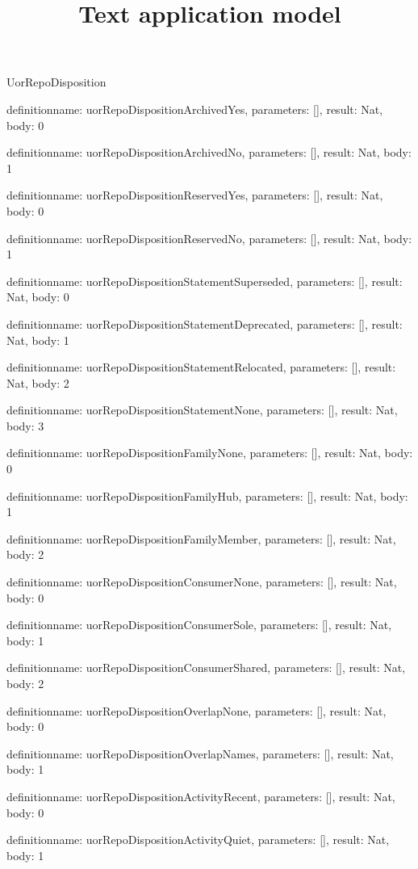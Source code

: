 \begin{lexlean}{UorRepoDisposition}
\title{Text application model}
\begin{semanticmodule}
definition{name: uorRepoDispositionArchivedYes, parameters: [], result: Nat, body: 0}

definition{name: uorRepoDispositionArchivedNo, parameters: [], result: Nat, body: 1}

definition{name: uorRepoDispositionReservedYes, parameters: [], result: Nat, body: 0}

definition{name: uorRepoDispositionReservedNo, parameters: [], result: Nat, body: 1}

definition{name: uorRepoDispositionStatementSuperseded, parameters: [], result: Nat, body: 0}

definition{name: uorRepoDispositionStatementDeprecated, parameters: [], result: Nat, body: 1}

definition{name: uorRepoDispositionStatementRelocated, parameters: [], result: Nat, body: 2}

definition{name: uorRepoDispositionStatementNone, parameters: [], result: Nat, body: 3}

definition{name: uorRepoDispositionFamilyNone, parameters: [], result: Nat, body: 0}

definition{name: uorRepoDispositionFamilyHub, parameters: [], result: Nat, body: 1}

definition{name: uorRepoDispositionFamilyMember, parameters: [], result: Nat, body: 2}

definition{name: uorRepoDispositionConsumerNone, parameters: [], result: Nat, body: 0}

definition{name: uorRepoDispositionConsumerSole, parameters: [], result: Nat, body: 1}

definition{name: uorRepoDispositionConsumerShared, parameters: [], result: Nat, body: 2}

definition{name: uorRepoDispositionOverlapNone, parameters: [], result: Nat, body: 0}

definition{name: uorRepoDispositionOverlapNames, parameters: [], result: Nat, body: 1}

definition{name: uorRepoDispositionActivityRecent, parameters: [], result: Nat, body: 0}

definition{name: uorRepoDispositionActivityQuiet, parameters: [], result: Nat, body: 1}


\end{semanticmodule}
\end{lexlean}
